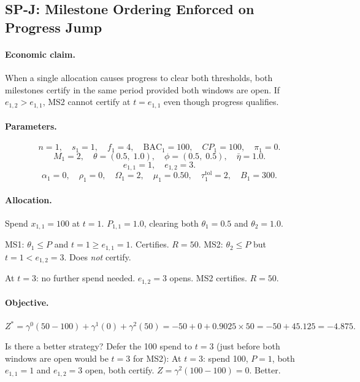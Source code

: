 \documentclass[11pt, a4paper]{article}
\newcommand{\BAC}{\mathrm{BAC}}
\begin{document}
\subsection{SP-J: Milestone Ordering Enforced on Progress Jump}

\paragraph{Economic claim.}
When a single allocation causes progress to clear both thresholds, both
milestones certify in the same period provided both windows are open.
If $e_{1,2}>e_{1,1}$, MS2 cannot certify at $t=e_{1,1}$ even though
progress qualifies.

\paragraph{Parameters.}
\[
  n=1,\quad s_1=1,\quad f_1=4,\quad\BAC_1=100,\quad CP_1=100,\quad\pi_1=0.
\]
\[
  M_1=2,\quad\theta=(0.5,\;1.0),\quad\phi=(0.5,\;0.5),\quad\bar\eta=1.0.
\]
\[
  e_{1,1}=1,\quad e_{1,2}=3.
\]
\[
  \alpha_1=0,\quad\rho_1=0,\quad\Omega_1=2,\quad\mu_1=0.50,\quad
  \tau_1^{\mathrm{tol}}=2,\quad B_1=300.
\]

\paragraph{Allocation.}
Spend $x_{1,1}=100$ at $t=1$. $P_{1,1}=1.0$, clearing both
$\theta_1=0.5$ and $\theta_2=1.0$.

MS1: $\theta_1\leq P$ and $t=1\geq e_{1,1}=1$. Certifies. $R=50$.
MS2: $\theta_2\leq P$ but $t=1 < e_{1,2}=3$. Does \emph{not} certify.

At $t=3$: no further spend needed. $e_{1,2}=3$ opens. MS2 certifies.
$R=50$.

\paragraph{Objective.}
\[
  Z^* = \gamma^0(50-100) + \gamma^1(0) + \gamma^2(50)
      = -50 + 0 + 0.9025\times50 = -50+45.125 = \mathbf{-4.875}.
\]

Is there a better strategy? Defer the 100 spend to $t=3$ (just before
both windows are open would be $t=3$ for MS2):
At $t=3$: spend 100, $P=1$, both $e_{1,1}=1$ and $e_{1,2}=3$ open,
both certify. $Z=\gamma^2(100-100)=0$. Better.
\end{document}
